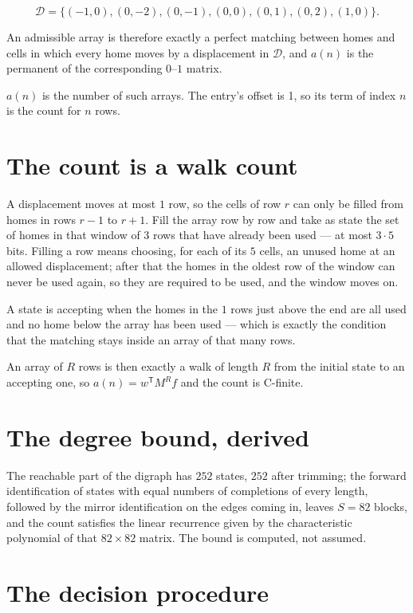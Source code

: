 \documentclass[11pt]{article}
\theoremstyle{definition}
\begin{document}
\[\mathcal{D} = \{(-1,0), (0,-2), (0,-1), (0,0), (0,1), (0,2), (1,0)\}.\]

An admissible array is therefore exactly a perfect matching between homes and cells in which every home moves by a displacement in $\mathcal{D}$, and $a(n)$ is the permanent of the corresponding $0$--$1$ matrix.

$a(n)$ is the number of such arrays. The entry's offset is 1, so its term of index $n$ is the count for $n$ rows.

\section{The count is a walk count}

A displacement moves at most $1$ row, so the cells of row $r$ can only be filled from homes in rows $r-1$ to $r+1$. Fill the array row by row and take as state the set of homes in that window of $3$ rows that have already been used --- at most $3\cdot5$ bits. Filling a row means choosing, for each of its $5$ cells, an unused home at an allowed displacement; after that the homes in the oldest row of the window can never be used again, so they are required to be used, and the window moves on.

A state is accepting when the homes in the $1$ rows just above the end are all used and no home below the array has been used --- which is exactly the condition that the matching stays inside an array of that many rows.

An array of $R$ rows is then exactly a walk of length $R$ from the initial state to an accepting one, so $a(n) = w^{\mathsf T}M^{R}f$ and the count is C-finite.

\section{The degree bound, derived}

The reachable part of the digraph has $252$ states, $252$ after trimming; the forward identification of states with equal numbers of completions of every length, followed by the mirror identification on the edges coming in, leaves $S = 82$ blocks, and the count satisfies the linear recurrence given by the characteristic polynomial of that $82\times82$ matrix. The bound is computed, not assumed.

\section{The decision procedure}
\end{document}
